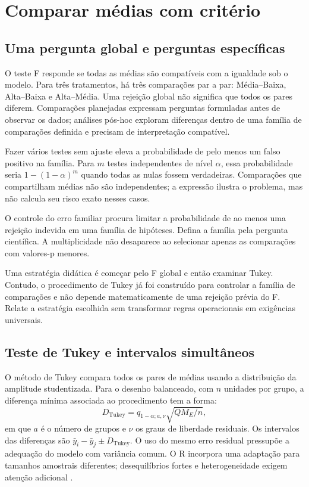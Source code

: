\chapter{Comparar médias com critério}

\section{Uma pergunta global e perguntas específicas}
O teste F responde se todas as médias são compatíveis com a igualdade sob o modelo. Para três tratamentos, há três comparações par a par: Média--Baixa, Alta--Baixa e Alta--Média. Uma rejeição global não significa que todos os pares diferem. Comparações planejadas expressam perguntas formuladas antes de observar os dados; análises pós-hoc exploram diferenças dentro de uma família de comparações definida e precisam de interpretação compatível.

Fazer vários testes sem ajuste eleva a probabilidade de pelo menos um falso positivo na família. Para $m$ testes independentes de nível $\alpha$, essa probabilidade seria $1-(1-\alpha)^m$ quando todas as nulas fossem verdadeiras. Comparações que compartilham médias não são independentes; a expressão ilustra o problema, mas não calcula seu risco exato nesses casos.

\begin{conceito}
O controle do erro familiar procura limitar a probabilidade de ao menos uma rejeição indevida em uma família de hipóteses. Defina a família pela pergunta científica. A multiplicidade não desaparece ao selecionar apenas as comparações com valores-p menores.
\end{conceito}

Uma estratégia didática é começar pelo F global e então examinar Tukey. Contudo, o procedimento de Tukey já foi construído para controlar a família de comparações e não depende matematicamente de uma rejeição prévia do F. Relate a estratégia escolhida sem transformar regras operacionais em exigências universais.

\section{Teste de Tukey e intervalos simultâneos}
O método de Tukey compara todos os pares de médias usando a distribuição da amplitude studentizada. Para o desenho balanceado, com $n$ unidades por grupo, a diferença mínima associada ao procedimento tem a forma:
\begin{equation}D_{\mathrm{Tukey}}=q_{1-\alpha;a,\nu}\sqrt{QM_E/n},\end{equation}
em que $a$ é o número de grupos e $\nu$ os graus de liberdade residuais. Os intervalos das diferenças são $\bar y_i-\bar y_j\pm D_{\mathrm{Tukey}}$. O uso do mesmo erro residual pressupõe a adequação do modelo com variância comum. O R incorpora uma adaptação para tamanhos amostrais diferentes; desequilíbrios fortes e heterogeneidade exigem atenção adicional \parencite{rtukey}.

